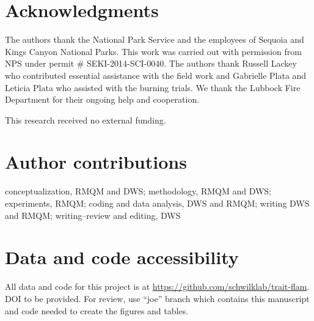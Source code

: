 \documentclass[letterpaper,12pt]{article}
\begin{document}

\section*{Acknowledgments}

The authors thank the National Park Service and the employees of Sequoia and
Kings Canyon National Parks. This work was carried out with permission from NPS
under permit \# SEKI-2014-SCI-0040. The authors thank Russell Lackey who
contributed essential assistance with the field work and Gabrielle Plata and
Leticia Plata who assisted with the burning trials. We thank the Lubbock Fire
Department for their ongoing help and cooperation.

This research received no external funding.

\section*{Author contributions}

conceptualization, RMQM and DWS; methodology, RMQM and DWS; experiments, RMQM;
coding and data analysis, DWS and RMQM; writing DWS and RMQM; writing--review
and editing, DWS

\section*{Data and code accessibility}
All data and code for this project is at
\url{https://github.com/schwilklab/trait-flam}. DOI to be provided. For review,
use ``joe'' branch which contains this manuscript and code needed to create the
figures and tables.

\newpage




\end{document}
